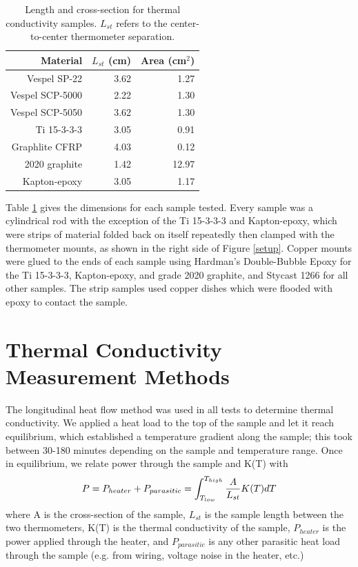 \documentclass[final]{svjour2}
\begin{document}
\begin{table}
\centering
\small
{}
\begin{tabular}{rrr}
\toprule
\textbf{Material} & $L_{st}$ (cm) & Area (cm$^2$) \\\midrule
Vespel SP-22 & 3.62 & 1.27 \\
Vespel SCP-5000 & 2.22 & 1.30 \\
Vespel SCP-5050 & 3.62 & 1.30 \\
Ti 15-3-3-3 & 3.05 & 0.91 \\
Graphlite CFRP & 4.03 & 0.12 \\
2020 graphite & 1.42 & 12.97 \\
Kapton-epoxy & 3.05 & 1.17 \\
\bottomrule
\end{tabular}
\caption{{\small Length and cross-section for thermal conductivity samples. $L_{st}$ refers to the center-to-center thermometer separation.}}
\label{dim}
\end{table}

Table \ref{dim} gives the dimensions for each sample tested. Every sample was a cylindrical rod with the exception of the Ti 15-3-3-3 and Kapton-epoxy, which were strips of material folded back on itself repeatedly then clamped with the thermometer mounts, as shown in the right side of Figure \ref{setup}. Copper mounts were glued to the ends of each sample using Hardman's Double-Bubble Epoxy for the Ti 15-3-3-3, Kapton-epoxy, and grade 2020 graphite, and Stycast 1266 for all other samples. The strip samples used copper dishes which were flooded with epoxy to contact the sample.

\section{Thermal Conductivity Measurement Methods}
The longitudinal heat flow method was used in all tests to determine thermal conductivity. We applied a heat load to the top of the sample and let it reach equilibrium, which established a temperature gradient along the sample; this took between 30-180 minutes depending on the sample and temperature range. Once in equilibrium, we relate power through the sample and K(T) with
\begin{equation}
P = P_{heater} + P_{parasitic} = \int_{T_{low}}^{T_{high}} \frac{A}{L_{st}} K(T)dT\\
\label{heat_flow}
\end{equation}
where A is the cross-section of the sample, $L_{st}$ is the sample length between the two thermometers, K(T) is the thermal conductivity of the sample, $P_{heater}$ is the power applied through the heater, and $P_{parasitic}$ is any other parasitic heat load through the sample (e.g. from wiring, voltage noise in the heater, etc.)
\end{document}
